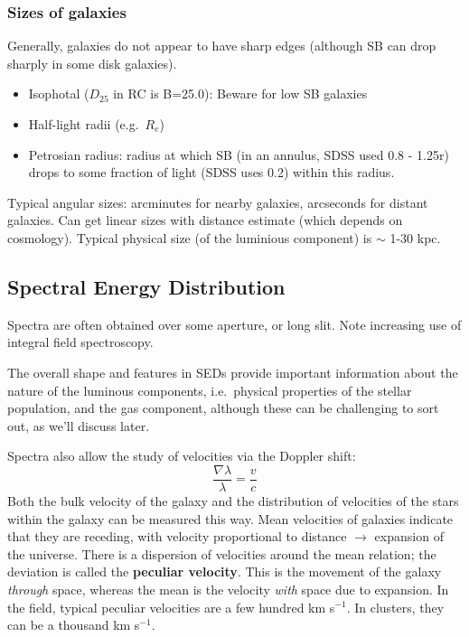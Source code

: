 \documentclass{article}
\newcommand{\mynotes}[1]{\textcolor{cadmiumorange}{#1}}
\begin{document}
\subsubsection{Sizes of galaxies}
Generally, galaxies do not appear to have sharp edges (although SB can
drop sharply in some disk galaxies).
\begin{itemize}
    \item Isophotal ($D_{25}$ in RC is B=25.0): Beware for low SB
        galaxies
    \item Half-light radii (e.g.\ $R_{e}$)
    \item Petrosian radius: radius at which SB (in an annulus, SDSS
        used 0.8 - 1.25r) drops to some fraction of light (SDSS uses
        0.2) within this radius.
\end{itemize}
Typical angular sizes: arcminutes for nearby galaxies, arcseconds for
distant galaxies. Can get linear sizes with distance estimate
(which depends on cosmology). Typical physical size (of the luminious
component) is $\sim$ 1-30 kpc.

\subsection{Spectral Energy Distribution}
Spectra are often obtained over some aperture, or long slit. Note
increasing use of integral field spectroscopy.

The overall shape and features in SEDs provide important information
about the nature of the luminous components, i.e.\ physical properties
of the stellar population, and the gas component, although these can
be challenging to sort out, as we'll discuss later.

Spectra also allow the study of
velocities via the Doppler shift:
\[
    \frac{\nabla\lambda}{\lambda} = \frac{v}{c}
\]
Both the bulk velocity of the galaxy and the
distribution of velocities of the stars within the galaxy can be
measured this way. Mean velocities of galaxies indicate that they are
receding, with velocity proportional to distance $\rightarrow$ expansion
of the universe. There is a dispersion of velocities around the mean
relation; the deviation is called the \textbf{peculiar velocity}.
\mynotes{This is the movement of the galaxy \emph{through} space,
whereas the mean is the velocity \emph{with} space due to expansion.}
In the field, typical peculiar velocities are a few hundred km s$^{-1}$.
In clusters, they can be a thousand km s$^{-1}$.
\end{document}
